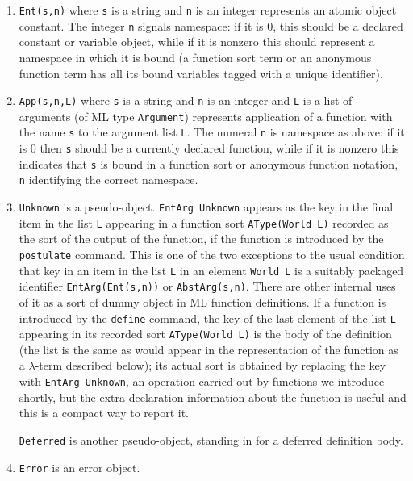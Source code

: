 \documentclass{article}
\begin{document}
\begin{enumerate}

\item {\tt Ent(s,n)} where {\tt s} is a string and {\tt n} is an integer represents an atomic object constant.  The integer {\tt n} signals namespace:  if it is 0, this should be a declared constant or variable object, while if it is nonzero this should represent a namespace in which it is bound (a function sort term or an anonymous function term has all its bound variables tagged with a unique identifier).

\item {\tt App(s,n,L)} where {\tt s} is a string and {\tt n} is an integer and {\tt L} is a list of arguments (of ML type {\tt Argument}) represents application of a function with the name {\tt s} to the argument list {\tt L}.  The numeral {\tt n} is namespace as above:  if it is 0 then {\tt s} should be a currently declared function, while if it is nonzero this indicates that {\tt s} is bound in a function sort or anonymous function notation, {\tt n} identifying the correct namespace.

\item {\tt Unknown} is a pseudo-object.  {\tt EntArg Unknown} appears as the key in the final item in the list {\tt L} appearing in a function sort
{\tt AType(World L)} recorded as the sort of the output of the function, if the function is introduced by the {\tt postulate} command.  This is one of the two exceptions to the usual condition that key in an item in the list {\tt L}
in an element {\tt World L} is a suitably packaged identifier {\tt EntArg(Ent(s,n))} or {\tt AbstArg(s,n)}.  There are other internal uses of it as a sort of dummy
object in ML function definitions.  If a function is introduced by the {\tt define} command, the key of the last element of the list {\tt L} appearing in its recorded sort
{\tt AType(World L)} is the body of the definition (the list is the same as would appear in the representation of the function as a $\lambda$-term described below); its actual sort is obtained by replacing the key with {\tt EntArg Unknown}, an operation carried out by functions we introduce shortly,
but the extra declaration information about the function is useful and this is a compact way to report it.

{\tt Deferred} is another pseudo-object, standing in for a deferred definition body.

\item {\tt Error} is an error object.

\end{enumerate}
\end{document}
